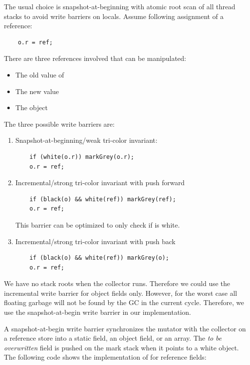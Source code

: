 The usual choice is snapshot-at-beginning with atomic root scan of
all thread stacks to avoid write barriers on locals. Assume
following assignment of a reference:
\begin{lstlisting}
    o.r = ref;
\end{lstlisting}
There are three references involved that can be manipulated:
\begin{itemize}
    \item The old value of 
    \item The new value 
    \item The object 
\end{itemize}
The three possible write barriers are:
\begin{enumerate}
    \item
Snapshot-at-beginning/weak tri-color invariant:
\begin{lstlisting}
    if (white(o.r)) markGrey(o.r);
    o.r = ref;
\end{lstlisting}
    \item
Incremental/strong tri-color invariant with push forward
\begin{lstlisting}
    if (black(o) && white(ref)) markGrey(ref);
    o.r = ref;
\end{lstlisting}
This barrier can be optimized to only check if  is white.

    \item
Incremental/strong tri-color invariant with push back
\begin{lstlisting}
    if (black(o) && white(ref)) markGrey(o);
    o.r = ref;
\end{lstlisting}

\end{enumerate}

We have no stack roots when the collector runs. Therefore we could
use the incremental write barrier for object fields only. However,
for the worst case all floating garbage will not be found by the GC
in the current cycle. Therefore, we use the snapshot-at-begin write
barrier in our implementation.



A snapshot-at-begin write barrier synchronizes the mutator with the
collector on a reference store into a static field, an object field,
or an array. The \emph{to be overwritten} field is pushed on the
mark stack when it points to a white object. The following code
shows the implementation of  for reference fields:

